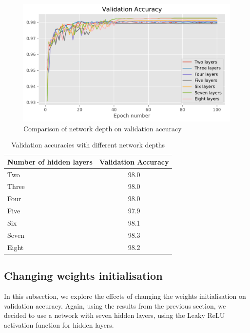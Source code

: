\documentclass{article}
\begin{document}
\begin{figure}[tb]
\vskip 5mm
\begin{center}
\centerline{\includegraphics[width=\columnwidth]{layers_acc}}
\caption{Comparison of network depth on validation accuracy}
\label{fig:lay-val-acc}
\end{center}
\vskip -5mm
\end{figure}

\begin{table}[tb]
\vskip 3mm
\begin{center}
\begin{small}
\begin{sc}
\begin{tabular}{lc}
\hline
\abovespace\belowspace
Number of hidden layers & Validation Accuracy  \\
\hline
\abovespace
Two    & 98.0  \\
Three  & 98.0  \\
Four    & 98.0 \\
Five    &  97.9\\
Six   &  98.1 \\
Seven	  & 98.3 \\
Eight    & 98.2 \\
\end{tabular}
\end{sc}
\end{small}
\caption{Validation accuracies with different network depths}
\label{tab:lay-table}
\end{center}
\vskip -3mm
\end{table}
\subsection{Changing weights initialisation}
In this subsection, we explore the effects of changing the weights initialisation on validation accuracy. Again, using the results from the previous section, we decided to use a network with seven hidden layers, using the Leaky ReLU activation function for hidden layers. 
\end{document}
